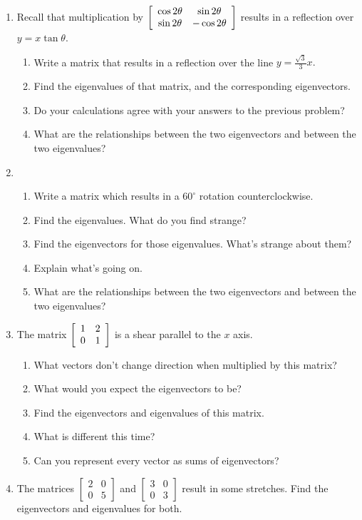 \documentclass[../gatm.tex]{subfiles}
\begin{document}
\begin{enumerate}
\begin{enumerate}
\end{enumerate}
\item Recall that multiplication by $\left[\begin{array}{cc} \cos 2\theta & \sin 2\theta \\ \sin 2\theta & -\cos 2\theta \end{array}\right]$ results in a reflection over $y=x\tan \theta$.
\begin{enumerate}
\item Write a matrix that results in a reflection over the line $y=\frac{\sqrt{3}}{3}x.$
\item Find the eigenvalues of that matrix, and the corresponding eigenvectors.
\item Do your calculations agree with your answers to the previous problem?
\item What are the relationships between the two eigenvectors and between the two eigenvalues?
\end{enumerate}
\item \begin{enumerate}
\item Write a matrix which results in a $60^\circ$ rotation counterclockwise.
\item Find the eigenvalues. What do you find strange?
\item Find the eigenvectors for those eigenvalues. What's strange about them?
\item Explain what's going on.
\item What are the relationships between the two eigenvectors and between the two eigenvalues?
\end{enumerate}
\item The matrix $\left[\begin{array}{cc} 1 & 2 \\ 0 & 1 \end{array}\right]$ is a shear parallel to the $x$ axis.
\begin{enumerate}
\item What vectors don't change direction when multiplied by this matrix?
\item What would you expect the eigenvectors to be?
\item Find the eigenvectors and eigenvalues of this matrix.
\item What is different this time?
\item Can you represent every vector as sums of eigenvectors?
\end{enumerate}
\item The matrices $\left[\begin{smallmatrix} 2 & 0 \\ 0 & 5 \end{smallmatrix}\right]$ and $\left[\begin{smallmatrix} 3 & 0 \\ 0 & 3 \end{smallmatrix}\right]$ result in some stretches. Find the eigenvectors and eigenvalues for both.

\end{enumerate}
\end{document}
